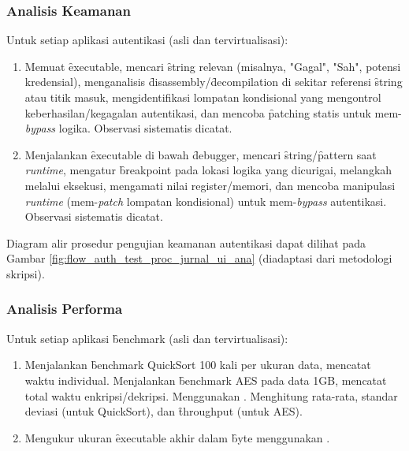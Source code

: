 \subsubsection{Analisis Keamanan}
Untuk setiap aplikasi autentikasi (asli dan tervirtualisasi):
\begin{enumerate}
    \item {} Memuat \f{executable}, mencari \f{string} relevan (misalnya, "Gagal", "Sah", potensi kredensial), menganalisis \f{disassembly}/\f{decompilation} di sekitar referensi \f{string} atau titik masuk, mengidentifikasi lompatan kondisional yang mengontrol keberhasilan/kegagalan autentikasi, dan mencoba \f{patching} statis untuk mem-\textit{bypass} logika. Observasi sistematis dicatat.
    \item {} Menjalankan \f{executable} di bawah \f{debugger}, mencari \f{string}/\f{pattern} saat \textit{runtime}, mengatur \f{breakpoint} pada lokasi logika yang dicurigai, melangkah melalui eksekusi, mengamati nilai register/memori, dan mencoba manipulasi \textit{runtime} (mem-\textit{patch} lompatan kondisional) untuk mem-\textit{bypass} autentikasi. Observasi sistematis dicatat.
\end{enumerate}
Diagram alir prosedur pengujian keamanan autentikasi dapat dilihat pada Gambar \ref{fig:flow_auth_test_proc_jurnal_ui_ana} (diadaptasi dari metodologi skripsi). %

\subsubsection{Analisis Performa}
Untuk setiap aplikasi \f{benchmark} (asli dan tervirtualisasi):
\begin{enumerate}
    \item {} Menjalankan \f{benchmark} QuickSort 100 kali per ukuran data, mencatat waktu individual. Menjalankan \f{benchmark} AES pada data 1GB, mencatat total waktu enkripsi/dekripsi. Menggunakan . Menghitung rata-rata, standar deviasi (untuk QuickSort), dan \f{throughput} (untuk AES).
    \item {} Mengukur ukuran \f{executable} akhir dalam \f{byte} menggunakan .
\end{enumerate}

